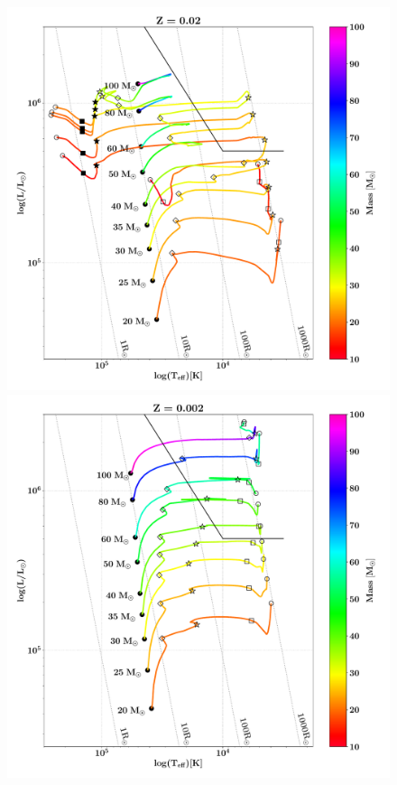 \documentclass[a4paper,titlepage]{book}     	%
\begin{document}
\begin{figure}[h!]
	\begin{minipage}{.49\textwidth}
		\centering
		\includegraphics[width=1.05\textwidth]{./images/HR_02.pdf}
	\end{minipage}
	\hfill
	\begin{minipage}{.49\textwidth}
		\centering
		\includegraphics[width=1.05\textwidth]{./images/HR_002.pdf}	

\end{minipage}
\end{figure}
\end{document}
